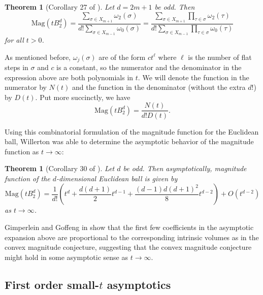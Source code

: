 \documentclass[11pt]{article}
\theoremstyle{mythm}
\newtheorem{theo}[defn]{Theorem}
\begin{document}
\begin{theo}[Corollary 27 of \cite{willerton_magnitude_2017}]\label{theo:willertonND}
Let $d = 2m+1$ be odd. Then
\begin{equation*}
\text{Mag}\left(tB_2^d\right) = \frac{\sum\limits_{\sigma\in X_{m+1}}\omega_2(\sigma)}{d!\sum\limits_{\sigma\in X_{m-1}}\omega_0(\sigma)} = \frac{\sum\limits_{\sigma\in X_{m+1}}\prod\limits_{\tau\in\sigma}\omega_2(\tau)}{d!\sum\limits_{\sigma\in X_{m-1}}\prod\limits_{\tau\in\sigma}\omega_0(\tau)}
\end{equation*}
for all $t > 0$.
\end{theo}
As mentioned before, $\omega_j(\sigma)$ are of the form $ct^\ell$ where $\ell$ is the number of flat steps in $\sigma$ and $c$ is a constant, so the numerator and the denominator in the expression above are both polynomials in $t$. We will denote the function in the numerator by $N(t)$ and the function in the denominator (without the extra $d!$) by $D(t)$. Put more succinctly, we have
\begin{equation*}
\text{Mag}\left(tB_2^d\right) = \frac{N(t)}{d!D(t)}.
\end{equation*}

Using this combinatorial formulation of the magnitude function for the Euclidean ball, Willerton was able to determine the asymptotic behavior of the magnitude function as $t\to\infty$:

\begin{theo}[Corollary 30 of \cite{willerton_magnitude_2017}]\label{theo:largetasymptotics}
Let $d$ be odd. Then asymptotically, magnitude function of the $d$-dimensional Euclidean ball is given by
\begin{equation*}
\text{Mag}\left(tB_2^d\right) = \frac{1}{d!}\left(t^d + \frac{d(d+1)}{2}t^{d-1} + \frac{(d-1)d(d+1)^2}{8}t^{d-2}\right) + O(t^{d-2})
\end{equation*}
as $t\to\infty$.
\end{theo}

Gimperlein and Goffeng in \cite{gimperlein_magnitude_2017} show that the first few coefficients in the asymptotic expansion above are proportional to the corresponding intrinsic volumes as in the convex magnitude conjecture, suggesting that the convex magnitude conjecture might hold in some asymptotic sense as $t\to\infty$.

\subsection{First order small-$t$ asymptotics}
\end{document}
